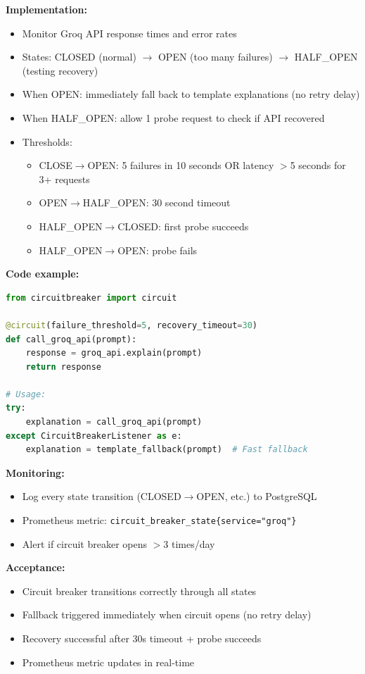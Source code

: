 \documentclass[11pt,a4paper]{article}
\begin{document}
\textbf{Implementation:}
\begin{itemize}[leftmargin=*]
    \item Monitor Groq API response times and error rates
    \item States: CLOSED (normal) $\rightarrow$ OPEN (too many failures) $\rightarrow$ HALF\_OPEN (testing recovery)
    \item When OPEN: immediately fall back to template explanations (no retry delay)
    \item When HALF\_OPEN: allow 1 probe request to check if API recovered
    \item Thresholds:
    \begin{itemize}
        \item CLOSE$\rightarrow$OPEN: 5 failures in 10 seconds OR latency $>$5 seconds for 3+ requests
        \item OPEN$\rightarrow$HALF\_OPEN: 30 second timeout
        \item HALF\_OPEN$\rightarrow$CLOSED: first probe succeeds
        \item HALF\_OPEN$\rightarrow$OPEN: probe fails
    \end{itemize}
\end{itemize}

\textbf{Code example:}
\begin{lstlisting}[language=Python]
from circuitbreaker import circuit

@circuit(failure_threshold=5, recovery_timeout=30)
def call_groq_api(prompt):
    response = groq_api.explain(prompt)
    return response

# Usage:
try:
    explanation = call_groq_api(prompt)
except CircuitBreakerListener as e:
    explanation = template_fallback(prompt)  # Fast fallback
\end{lstlisting}

\textbf{Monitoring:}
\begin{itemize}[leftmargin=*]
    \item Log every state transition (CLOSED$\rightarrow$OPEN, etc.) to PostgreSQL
    \item Prometheus metric: \texttt{circuit\_breaker\_state\{service="groq"\}}
    \item Alert if circuit breaker opens $>$3 times/day
\end{itemize}

\textbf{Acceptance:}
\begin{itemize}[leftmargin=*]
    \item[$\checkmark$] Circuit breaker transitions correctly through all states
    \item[$\checkmark$] Fallback triggered immediately when circuit opens (no retry delay)
    \item[$\checkmark$] Recovery successful after 30s timeout + probe succeeds
    \item[$\checkmark$] Prometheus metric updates in real-time
\end{itemize}
\end{document}
